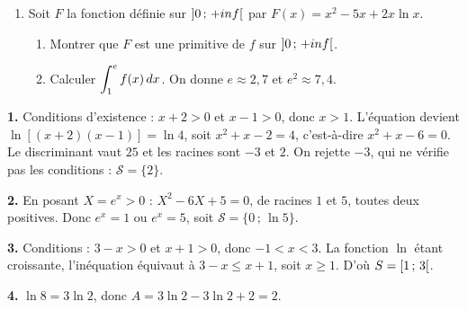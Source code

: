 \begin{devoirsurveille}
\begin{enumerate}[label=\textbf{\arabic*.}, leftmargin=*, itemsep=0.25em, start=7]
  \item Soit $F$ la fonction définie sur $\left]0\,;\,+inf\right[$ par
        $F(x) = x^{2}-5x+2x\ln x$.
    \begin{enumerate}[label=\textbf{\alph*)}, leftmargin=1.4em, itemsep=0.15em]
      \item Montrer que $F$ est une primitive de $f$ sur
            $\left]0\,;\,+inf\right[$. 
      \item Calculer $\displaystyle\int_{1}^{e} f(x)\,dx$. On donne
            $e \approx 2{,}7$ et $e^{2} \approx 7{,}4$. 
    \end{enumerate}
\end{enumerate}
\end{devoirsurveille}

\begin{corrige}
\textbf{1.} Conditions d'existence : $x+2>0$ et $x-1>0$, donc $x>1$.
L'équation devient $\ln\left[(x+2)(x-1)\right] = \ln4$, soit
$x^{2}+x-2 = 4$, c'est-à-dire $x^{2}+x-6 = 0$. Le discriminant vaut $25$ et
les racines sont $-3$ et $2$. On rejette $-3$, qui ne vérifie pas les
conditions : $\mathcal S = \{2\}$.

\textbf{2.} En posant $X = e^{x}>0$ : $X^{2}-6X+5 = 0$, de racines $1$ et
$5$, toutes deux positives. Donc $e^{x} = 1$ ou $e^{x} = 5$, soit
$\mathcal S = \{0\,;\,\ln5\}$.

\textbf{3.} Conditions : $3-x>0$ et $x+1>0$, donc $-1<x<3$. La fonction
$\ln$ étant croissante, l'inéquation équivaut à $3-x \leq x+1$, soit
$x \geq 1$. D'où $S = \left[1\,;\,3\right[$.

\textbf{4.} $\ln8 = 3\ln2$, donc $A = 3\ln2-3\ln2+2 = 2$.
\end{corrige}

